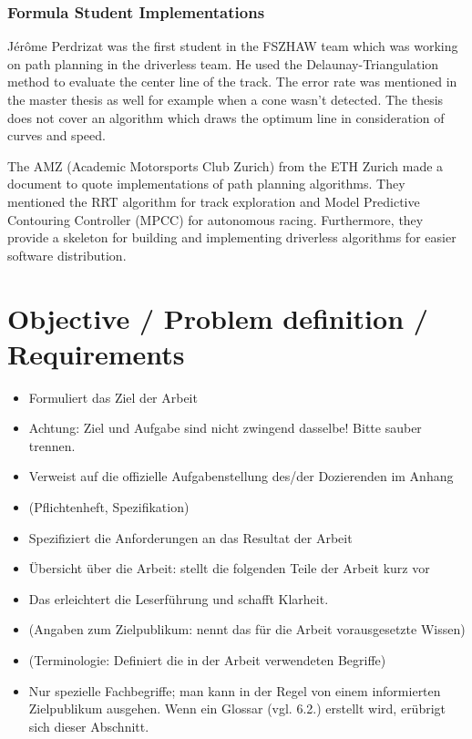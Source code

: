 \subsubsection{Formula Student Implementations}
Jérôme Perdrizat was the first student in the FSZHAW team which was working on path planning in the driverless team. He used the Delaunay-Triangulation method to evaluate the center line of the track. The error rate was mentioned in the master thesis as well for example when a cone wasn't detected. The thesis does not cover an algorithm which draws the optimum line in consideration of curves and speed.
\cite{autopilot_for_formula_student_jerome}

The AMZ (Academic Motorsports Club Zurich) from the ETH Zurich made a document to quote implementations of path planning algorithms. They mentioned the RRT algorithm for track exploration and Model Predictive Contouring Controller (MPCC) for autonomous racing. Furthermore, they provide a skeleton for building and implementing driverless algorithms for easier software distribution.
\cite{amz_racing_github}

\section{Objective / Problem definition / Requirements}
\begin{itemize}
    \item Formuliert das Ziel der Arbeit
    \item Achtung: Ziel und Aufgabe sind nicht zwingend dasselbe! Bitte sauber trennen.
    \item Verweist auf die offizielle Aufgabenstellung des/der Dozierenden im Anhang
    \item (Pflichtenheft, Spezifikation)
    \item Spezifiziert die Anforderungen an das Resultat der Arbeit
    \item Übersicht über die Arbeit: stellt die folgenden Teile der Arbeit kurz vor
    \item Das erleichtert die Leserführung und schafft Klarheit.
    \item (Angaben zum Zielpublikum: nennt das für die Arbeit vorausgesetzte Wissen)
    \item (Terminologie: Definiert die in der Arbeit verwendeten Begriffe)
    \item Nur spezielle Fachbegriffe; man kann in der Regel von einem informierten Zielpublikum ausgehen.
    Wenn ein Glossar (vgl. 6.2.) erstellt wird, erübrigt sich dieser Abschnitt.
\end{itemize}

